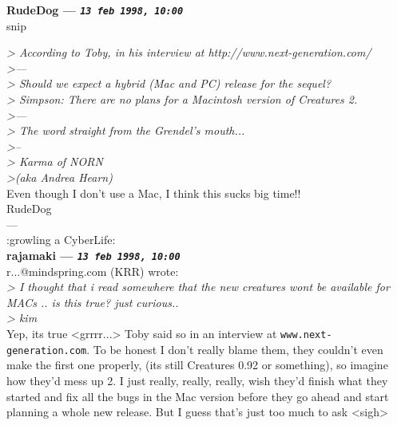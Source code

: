 \documentclass[11pt,twoside,a4paper]{article}
\begin{document}
\begin{multicols*}{2}
	
		
\textbf{RudeDog --- \emph{\texttt{13 feb 1998, 10:00}}}~\\

{snip}

\emph{> According to Toby, in his interview at \emph{http://www.next-generation.com/}}~\\

\emph{>---}~\\
\emph{> Should we expect a hybrid (Mac and PC) release for the sequel?}~\\
\emph{> Simpson: There are no plans for a Macintosh version of Creatures 2.}~\\
\emph{>---}~\\

\emph{> The word straight from the Grendel's mouth...}~\\
\emph{>--}~\\
\emph{> Karma of NORN}~\\
\emph{>(aka Andrea Hearn)}~\\

Even though I don't use a Mac, I think this sucks big time!! ~\\

RudeDog ~\\
--- ~\\
:growling a CyberLife: ~\\

 
		
	
		
\textbf{rajamaki --- \emph{\texttt{13 feb 1998, 10:00}}}~\\

r...@mindspring.com (KRR) wrote: ~\\

\emph{> I thought that i read somewhere that the new creatures wont be available for MACs ..    is this true?    just curious..}~\\
\emph{> kim}~\\

Yep, its true <grrrr...> Toby said so in an interview at \texttt{www.next-generation.com}.  To be honest I don't really blame them, they couldn't even make the first one properly, (its still Creatures 0.92 or something), so imagine how they'd mess up 2. I just really, really, really, wish they'd finish what they started and fix all the bugs in the Mac version before they go ahead and start planning a whole new release. But I guess that's just too much to ask <sigh> ~\\


\end{multicols*}
\end{document}

